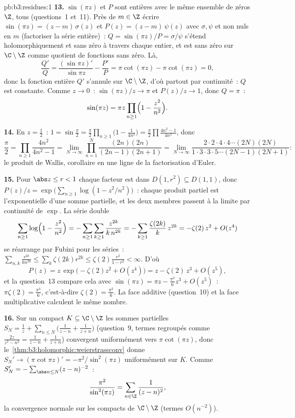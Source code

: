 \begin{solution}{pb:b3:residues:1}
\textbf{13.} $\sin(\pi z)$ et $P$ sont entières avec le même
ensemble de zéros $\Z$, tous  (questions~1 et~11).
Près de $m \in \Z$ écrire $\sin(\pi z) = (z - m)\,\sigma(z)$
et $P(z) = (z - m)\,\psi(z)$ avec $\sigma, \psi$ 
et non nuls en $m$ (factoriser la série entière)~: $Q =
\sin(\pi z)/P = \sigma/\psi$ s'étend holomorphiquement et
sans zéro à travers chaque entier, et est sans zéro sur
$\C\setminus\Z$ comme quotient de fonctions sans zéro. Là,
\[
\frac{Q'}{Q} = \frac{(\sin\pi z)'}{\sin\pi z} -
\frac{P'}{P} = \pi\cot(\pi z) - \pi\cot(\pi z) = 0 ,
\]
donc la fonction entière $Q'$ s'annule sur $\C\setminus\Z$,
d'où partout par continuité~: $Q$ est constante. Comme $z
\to 0$~: $\sin(\pi z)/z \to \pi$ et $P(z)/z \to 1$, donc $Q
= \pi$~:
\[
\sin(\pi z) = \pi z\prod_{n\geq1}
\Bigl(1 - \frac{z^2}{n^2}\Bigr) .
\]

\textbf{14.} En $z = \frac12$~: $1 = \sin\frac\pi2 =
\frac\pi2\prod_{n\geq1}\bigl(1 - \frac1{4n^2}\bigr) =
\frac\pi2\prod\frac{4n^2-1}{4n^2}$, donc
\[
\frac\pi2 = \prod_{n\geq1}\frac{4n^2}{4n^2 - 1}
= \lim_{N\to\infty}\prod_{n=1}^N
\frac{(2n)(2n)}{(2n-1)(2n+1)}
= \lim_{N\to\infty}
\frac{2\cdot2\cdot4\cdot4\cdots(2N)(2N)}
{1\cdot3\cdot3\cdot5\cdots(2N-1)(2N+1)} :
\]
le produit de Wallis, corollaire en une ligne de la
factorisation d'Euler.

\textbf{15.} Pour $\abs z \leq r < 1$ chaque facteur est
dans $D(1, r^2) \subseteq D(1, 1)$, donc $P(z)/z =
\exp\bigl( \sum_{n\geq1}\log(1 - z^2/n^2)\bigr)$~: chaque
produit partiel est l'exponentielle d'une somme partielle,
et les deux membres passent à la limite par continuité de
$\exp$. La série double
\[
\sum_{n\geq1}\log\Bigl(1 - \frac{z^2}{n^2}\Bigr)
= -\sum_{n\geq1}\sum_{k\geq1}\frac{z^{2k}}{k\,n^{2k}}
= -\sum_{k\geq1}\frac{\zeta(2k)}k\,z^{2k}
= -\zeta(2)\,z^2 + O(z^4)
\]
se réarrange par Fubini pour les séries~: $\sum_{n,k}
\frac{r^{2k}}{kn^{2k}} \leq \sum_k\zeta(2k)r^{2k} \leq
\zeta(2)\frac{r^2}{1-r^2} < \infty$. D'où
\[
P(z) = z\,\exp\bigl(-\zeta(2)z^2 + O(z^4)\bigr)
= z - \zeta(2)\,z^3 + O(z^5) ,
\]
et la question~13 compare cela avec $\sin(\pi z) = \pi z -
\frac{\pi^3}6z^3 + O(z^5)$~: $\pi\zeta(2) = \frac{\pi^3}6$,
c'est-à-dire $\zeta(2) = \frac{\pi^2}6$. La face additive
(question~10) et la face multiplicative calculent le même
nombre.

\textbf{16.} Sur un compact $K \subseteq \C\setminus\Z$ les
sommes partielles $S_N = \frac1z + \sum_{n\leq N}\bigl(
\frac1{z-n} + \frac1{z+n}\bigr)$ (question~9, termes
regroupés comme $\frac{2z}{z^2-n^2} = \frac1{z-n} +
\frac1{z+n}$) convergent uniformément vers $\pi\cot(\pi
z)$, donc le~\cref{thm:b3:holomorphic:weierstrassconv}
donne $S_N' \to (\pi\cot\pi z)' = -\pi^2/\sin^2(\pi z)$
uniformément sur $K$. Comme $S_N' = -\sum_{\abs n\leq
N}(z - n)^{-2}$~:
\[
\frac{\pi^2}{\sin^2(\pi z)} =
\sum_{n\in\Z}\frac1{(z - n)^2} ,
\]
la convergence normale sur les compacts de $\C\setminus\Z$
(termes $O(n^{-2})$).


\end{solution}
